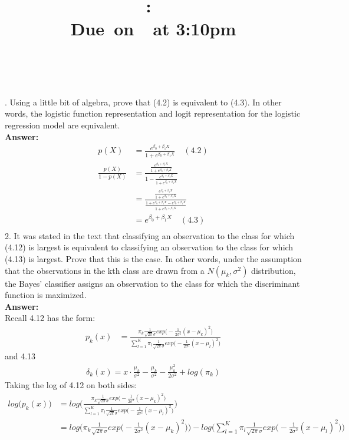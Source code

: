 \documentclass[12pt]{article}
\title{
    \vspace{2in}
    \textmd{\textbf{\hmwkClass:\ \hmwkTitle}}\\
    \normalsize\vspace{0.1in}\small{Due\ on\ \hmwkDueDate\ at 3:10pm}\\
    \vspace{0.1in}\large{\textit{\hmwkClassInstructor\ \hmwkClassTime}}
    \vspace{3in}
}
\author{\textbf{\hmwkAuthorName}}
\date{}
\begin{document}
\maketitle

. Using a little bit of algebra, prove that (4.2) is equivalent to (4.3). In other words, the logistic function representation and logit representation for the logistic regression model are equivalent. \\
\textbf{Answer:}\\
\begin{align*}
p(X)&=\frac{e^{\beta_0+\beta_1X}}{1+e^{\beta_0+\beta_1X}}\quad (4.2)\\
\frac{p(X)}{1-p(X)}&=\frac{\frac{e^{\beta_0+\beta_1X}}{1+e^{\beta_0+\beta_1X}}}{1-\frac{e^{\beta_0+\beta_1X}}{1+e^{\beta_0+\beta_1X}}}\\
&=\frac{\frac{e^{\beta_0+\beta_1X}}{1+e^{\beta_0+\beta_1X}}}{\frac{1+e^{\beta_0+\beta_1X}-e^{\beta_0+\beta_1X}}{1+e^{\beta_0+\beta_1X}}}\\
&=e^{\beta_0+\beta_1X} \quad (4.3)\\
\end{align*}
2. It was stated in the text that classifying an observation to the class for which (4.12) is largest is equivalent to classifying an observation to the class for which (4.13) is largest. Prove that this is the case. In other words, under the assumption that the observations in the kth class are drawn from a $N(\mu_k,\sigma^2)$ distribution, the Bayes' classifier assigns an observation to the class for which the discriminant function is maximized.\\
\textbf{Answer:}\\
Recall 4.12 has the form:
\begin{align*}
p_k(x)&=\frac{\pi_k\frac{1}{\sqrt{2\pi}\sigma}exp\big(-\frac{1}{2\sigma^2}(x-\mu_k)^2\big)}{\sum_{l=1}^K{}\pi_l\frac{1}{\sqrt{2\pi}\sigma}exp\big(-\frac{1}{2\sigma^2}(x-\mu_l)^2\big)}
\end{align*}
and 4.13
\begin{align*}
\delta_k(x)=x \cdot \frac{\mu_k}{\sigma^2}-\frac{\mu_k}{\sigma^2}-\frac{\mu_k^2}{2\sigma^2}+log(\pi_k)
\end{align*}
Taking the log of 4.12 on both sides:
\begin{align*}
log\big(p_k(x)\big)&=log\Big(\frac{\pi_k\frac{1}{\sqrt{2\pi}\sigma}exp\big(-\frac{1}{2\sigma^2}(x-\mu_k)^2\big)}{\sum_{l=1}^K{}\pi_l\frac{1}{\sqrt{2\pi}\sigma}exp\big(-\frac{1}{2\sigma^2}(x-\mu_l)^2\big)}\Big)\\
&=log\Big(\pi_k\frac{1}{\sqrt{2\pi}\sigma}exp\big(-\frac{1}{2\sigma^2}(x-\mu_k)^2\big)\Big)-log\Big( \sum_{l=1}^K{}\pi_l\frac{1}{\sqrt{2\pi}\sigma}exp\big(-\frac{1}{2\sigma^2}(x-\mu_l)^2\big)\Big)\\
\end{align*}
\end{document}
